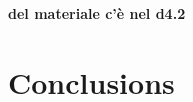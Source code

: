 \documentclass{riverk}
\begin{document}
\textbf{del materiale c'è nel d4.2} 



\section{Conclusions}







\end{document}
